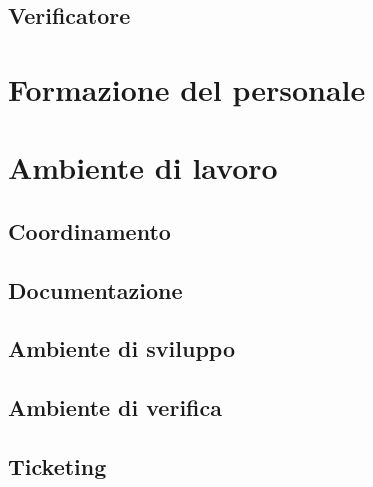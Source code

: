 \documentclass[NormeDiProgetto.tex]{subfiles}
\begin{document}
\subsection{Verificatore}

\section{Formazione del personale}

\section{Ambiente di lavoro}
\subsection{Coordinamento}
\subsection{Documentazione}
\subsection{Ambiente di sviluppo}
\subsection{Ambiente di verifica}
\subsection{Ticketing}
\end{document}
